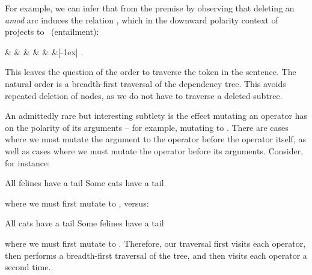 For example, we can infer that 
   from the premise
   by observing that deleting
  an \textit{amod} arc induces the relation \reverse, which in the downward
  polarity context of \textit{} projects to \forward\ (entailment):

\begin{center}
\begin{dependency}[text only label, label style={above}]
  \begin{deptext}[column sep=-0.00cm]
     \&  \&  \& 
       \&  \&  \&[-1ex] .\\
  \end{deptext}
\end{dependency}
\end{center}

This leaves the question of the order to traverse the token in the sentence.
The natural order is a breadth-first traversal of the dependency tree.
This avoids repeated deletion of nodes, as we do not have to traverse a
  deleted subtree.

An admittedly rare but interesting subtlety is the effect mutating an 
  operator has on the
  polarity of its arguments -- for example, mutating  to .
There are cases where we must mutate the argument to the operator before
  the operator itself, as well as cases where we must mutate the operator
  before its arguments.
Consider, for instance:

\entailmentExample
{All felines have a tail}
{Some cats have a tail}

\noindent where we must first mutate  to , versus:

\entailmentExample
{All cats have a tail}
{Some felines have a tail}

\noindent where we must first mutate  to .
Therefore, our traversal first visits each operator, then performs a breadth-first
  traversal of the tree, and then visits each operator a second time.

